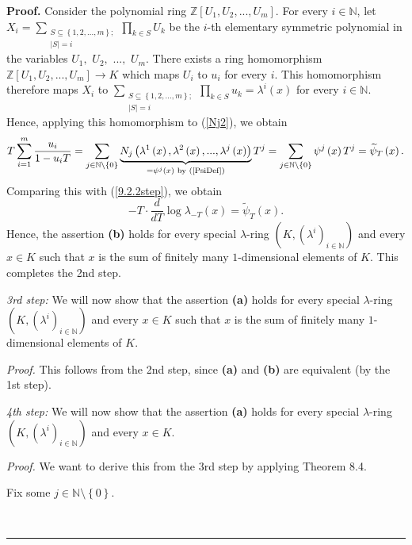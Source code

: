 \documentclass[numbers=enddot,12pt,final,onecolumn,notitlepage]{scrartcl}%
\newenvironment{proof}[1][Proof]{\noindent\textbf{#1.} }{\ \rule{0.5em}{0.5em}}
\begin{document}
\begin{proof}
Consider the polynomial ring $\mathbb{Z}\left[  U_{1},U_{2},...,U_{m}\right]
$. For every $i\in\mathbb{N}$, let $X_{i}=\sum\limits_{\substack{S\subseteq
\left\{  1,2,...,m\right\}  ;\\\left\vert S\right\vert =i}}\prod\limits_{k\in
S}U_{k}$ be the $i$-th elementary symmetric polynomial in the variables
$U_{1},$ $U_{2},$ $...,$ $U_{m}$. There exists a ring homomorphism
$\mathbb{Z}\left[  U_{1},U_{2},...,U_{m}\right]  \rightarrow K$ which maps
$U_{i}$ to $u_{i}$ for every $i$. This homomorphism therefore maps $X_{i}$ to
$\sum\limits_{\substack{S\subseteq\left\{  1,2,...,m\right\}  ;\\\left\vert
S\right\vert =i}}\prod\limits_{k\in S}u_{k}=\lambda^{i}\left(  x\right)  $ for
every $i\in\mathbb{N}$. Hence, applying this homomorphism to (\ref{Nj2}), we
obtain%
\[
T\sum_{i=1}^{m}\dfrac{u_{i}}{1-u_{i}T}=\sum_{j\in\mathbb{N}\setminus\left\{
0\right\}  }\underbrace{N_{j}\left(  \lambda^{1}\left(  x\right)  ,\lambda
^{2}\left(  x\right)  ,...,\lambda^{j}\left(  x\right)  \right)  }_{=\psi
^{j}\left(  x\right)  \text{ by (\ref{PsiDef})}}T^{j}=\sum_{j\in
\mathbb{N}\setminus\left\{  0\right\}  }\psi^{j}\left(  x\right)
T^{j}=\widetilde{\psi}_{T}\left(  x\right)  .
\]
Comparing this with (\ref{9.2.2step}), we obtain%
\[
-T\cdot\dfrac{d}{dT}\log\lambda_{-T}\left(  x\right)  =\widetilde{\psi}%
_{T}\left(  x\right)  .
\]
Hence, the assertion \textbf{(b)} holds for every special $\lambda$-ring
$\left(  K,\left(  \lambda^{i}\right)  _{i\in\mathbb{N}}\right)  $ and every
$x\in K$ such that $x$ is the sum of finitely many $1$-dimensional elements of
$K$. This completes the 2nd step.

\textit{3rd step:} We will now show that the assertion \textbf{(a)} holds for
every special $\lambda$-ring $\left(  K,\left(  \lambda^{i}\right)
_{i\in\mathbb{N}}\right)  $ and every $x\in K$ such that $x$ is the sum of
finitely many $1$-dimensional elements of $K$.

\textit{Proof.} This follows from the 2nd step, since \textbf{(a)} and
\textbf{(b)} are equivalent (by the 1st step).

\textit{4th step:} We will now show that the assertion \textbf{(a)} holds for
every special $\lambda$-ring $\left(  K,\left(  \lambda^{i}\right)
_{i\in\mathbb{N}}\right)  $ and every $x\in K$.

\textit{Proof.} We want to derive this from the 3rd step by applying Theorem 8.4.

Fix some $j\in\mathbb{N}\setminus\left\{  0\right\}  $.


\end{proof}
\end{document}
